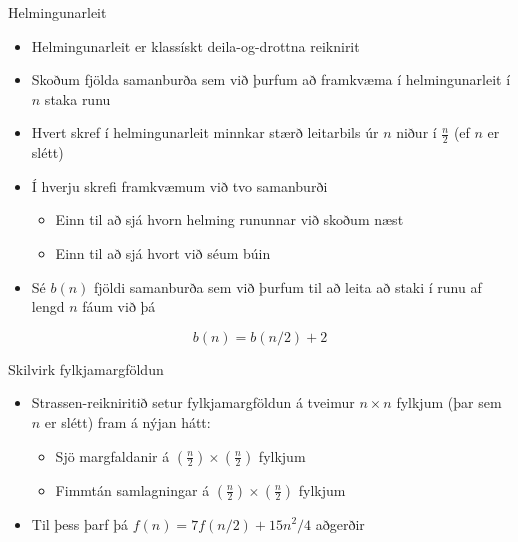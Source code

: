 \documentclass[handout]{beamer}
\begin{document}
\begin{frame}{Helmingunarleit}
    \begin{itemize}
        \item Helmingunarleit er klassískt deila-og-drottna reiknirit
        \item Skoðum fjölda samanburða sem við þurfum að framkvæma í helmingunarleit í $n$ staka runu
        \item Hvert skref í helmingunarleit minnkar stærð leitarbils úr $n$ niður í $\frac{n}{2}$ (ef $n$ er slétt)
        \item Í hverju skrefi framkvæmum við tvo samanburði
        \begin{itemize}
            \item Einn til að sjá hvorn helming rununnar við skoðum næst
            \item Einn til að sjá hvort við séum búin
        \end{itemize}
        \item Sé $b(n)$ fjöldi samanburða sem við þurfum til að leita að staki í runu af lengd $n$ fáum við þá
        \end{itemize}
        \[
        b(n) = b(n/2) + 2
        \]
\end{frame}

\begin{frame}{Skilvirk fylkjamargföldun}
    \begin{itemize}
        \item Strassen-reikniritið setur fylkjamargföldun á tveimur $n \times n$ fylkjum (þar sem $n$ er slétt) fram á nýjan hátt:
        \begin{itemize}
            \item Sjö margfaldanir á $\left(\frac{n}{2}\right)\times \left(\frac{n}{2}\right)$ fylkjum
            \item Fimmtán samlagningar á $\left(\frac{n}{2}\right)\times \left(\frac{n}{2}\right)$ fylkjum
        \end{itemize}
        \item Til þess þarf þá $f(n) = 7f(n/2) + 15n^2/4$ aðgerðir
    \end{itemize}
\end{frame}
\end{document}
